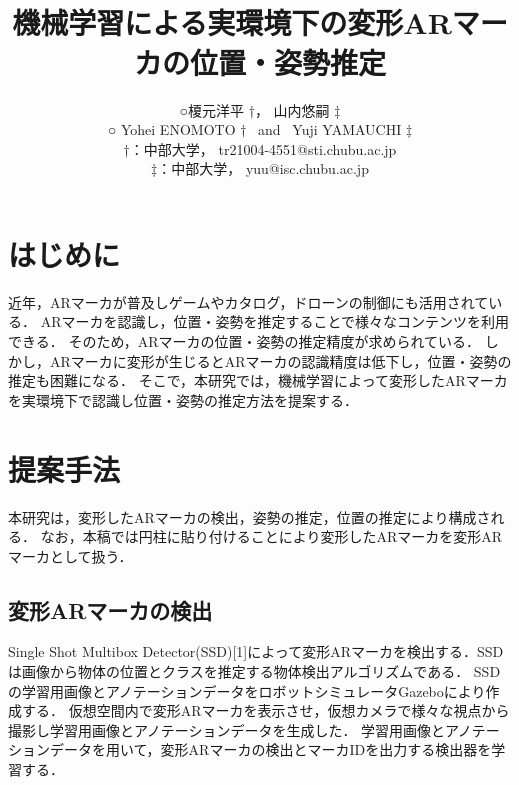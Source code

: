 \documentclass[a4j,twocolumn,10pt]{jarticle}
\title{
\vspace{15mm}
\Large{
\textbf{\leftline{【若手研究奨励賞候補：はい】}}\\
\textbf{機械学習による実環境下の変形ARマーカの位置・姿勢推定}} %
}
\author{
\vspace{1.5em}
\large{○榎元洋平 $\dagger$，} %
\large{山内悠嗣 $\ddagger$}\\                 %
\vspace{1em}
\large{{\rm ○ Yohei ENOMOTO $\dagger$\ }             %
{\rm and\ }
{\rm Yuji YAMAUCHI $\ddagger$} }\\     %
\vspace{0.5em}
\large{$\dagger$：中部大学，}     %
{\rm tr21004-4551@sti.chubu.ac.jp} \\                    %
\large{$\ddagger$：中部大学，}    %
{\rm yuu@isc.chubu.ac.jp }\\                     %
}
\date{} %
\begin{document}
\vspace{1em}

\section{はじめに}
近年，ARマーカが普及しゲームやカタログ，ドローンの制御にも活用されている．
ARマーカを認識し，位置・姿勢を推定することで様々なコンテンツを利用できる．
そのため，ARマーカの位置・姿勢の推定精度が求められている．
しかし，ARマーカに変形が生じるとARマーカの認識精度は低下し，位置・姿勢の推定も困難になる．
そこで，本研究では，機械学習によって変形したARマーカを実環境下で認識し位置・姿勢の推定方法を提案する．

\section{提案手法}
本研究は，変形したARマーカの検出，姿勢の推定，位置の推定により構成される．
なお，本稿では円柱に貼り付けることにより変形したARマーカを変形ARマーカとして扱う．


\subsection{変形ARマーカの検出}
Single Shot Multibox Detector(SSD)[1]によって変形ARマーカを検出する．SSDは画像から物体の位置とクラスを推定する物体検出アルゴリズムである．
SSDの学習用画像とアノテーションデータをロボットシミュレータGazeboにより作成する．
仮想空間内で変形ARマーカを表示させ，仮想カメラで様々な視点から撮影し学習用画像とアノテーションデータを生成した．
学習用画像とアノテーションデータを用いて，変形ARマーカの検出とマーカIDを出力する検出器を学習する．
\end{document}
